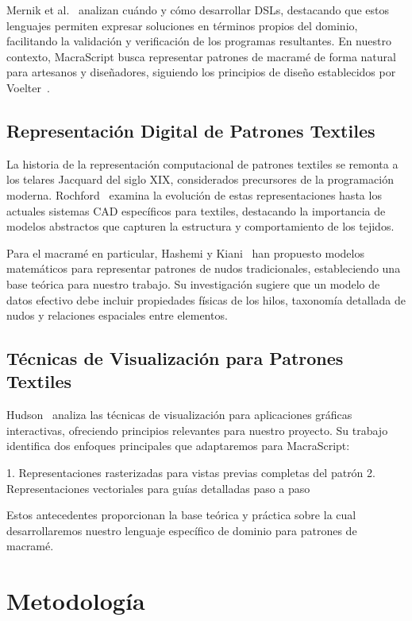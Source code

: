 \documentclass[12pt,a4paper]{report}
\begin{document}
Mernik et al.~\cite{mernik2005} analizan cuándo y cómo desarrollar DSLs, destacando que estos lenguajes permiten expresar soluciones en términos propios del dominio, facilitando la validación y verificación de los programas resultantes. En nuestro contexto, MacraScript busca representar patrones de macramé de forma natural para artesanos y diseñadores, siguiendo los principios de diseño establecidos por Voelter~\cite{voelter2013}.

\section{Representación Digital de Patrones Textiles}
La historia de la representación computacional de patrones textiles se remonta a los telares Jacquard del siglo XIX, considerados precursores de la programación moderna. Rochford~\cite{rochford2019} examina la evolución de estas representaciones hasta los actuales sistemas CAD específicos para textiles, destacando la importancia de modelos abstractos que capturen la estructura y comportamiento de los tejidos.

Para el macramé en particular, Hashemi y Kiani~\cite{hashemi2017} han propuesto modelos matemáticos para representar patrones de nudos tradicionales, estableciendo una base teórica para nuestro trabajo. Su investigación sugiere que un modelo de datos efectivo debe incluir propiedades físicas de los hilos, taxonomía detallada de nudos y relaciones espaciales entre elementos.

\section{Técnicas de Visualización para Patrones Textiles}
Hudson~\cite{hudson2018} analiza las técnicas de visualización para aplicaciones gráficas interactivas, ofreciendo principios relevantes para nuestro proyecto. Su trabajo identifica dos enfoques principales que adaptaremos para MacraScript:

1. Representaciones rasterizadas para vistas previas completas del patrón
2. Representaciones vectoriales para guías detalladas paso a paso

Estos antecedentes proporcionan la base teórica y práctica sobre la cual desarrollaremos nuestro lenguaje específico de dominio para patrones de macramé.

\chapter{Metodología}
\end{document}
